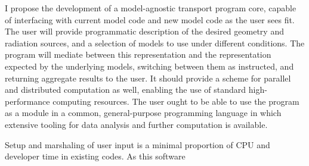\documentclass{article}
\begin{document}
I propose the development of a model-agnostic transport program core, capable of interfacing with current model code and new model code as the user sees fit.
The user will provide programmatic description of the desired geometry and radiation sources, and a selection of models to use under different conditions.
The program will mediate between this representation and the representation expected by the underlying models, switching between them as instructed,
and returning aggregate results to the user.
It should provide a scheme for parallel and distributed computation as well, enabling the use of standard high-performance computing resources.
The user ought to be able to use the program as a module in a common, general-purpose programming language in which extensive tooling for data analysis
and further computation is available.

Setup and marshaling of user input is a minimal proportion of CPU and developer time in existing codes.
As this software
\begin{center}
  
\end{center}
\end{document}
